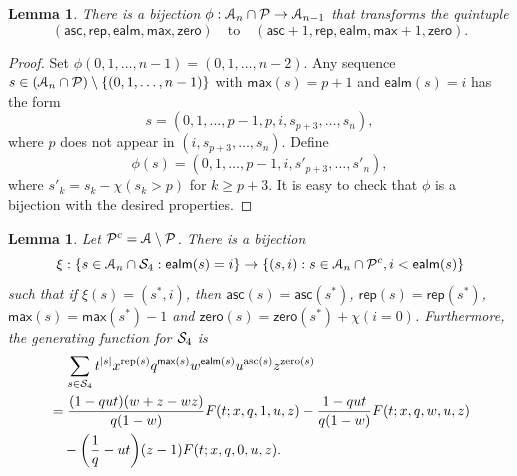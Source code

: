 \documentclass[12pt]{amsart}
\newcounter{mycount}
\theoremstyle{plain}
\newtheorem{lemma}[mycount]{Lemma}
\theoremstyle{definition}
\theoremstyle{example}
\theoremstyle{remark}
\numberwithin{equation}{section}
\numberwithin{figure}{section}
\newcommand{\asc}{\mathsf{asc}}
\def\max{\mathsf{max}}
\def\zero{\mathsf{zero}}
\def\rep{\mathsf{rep}}
\def\ealm{\mathsf{ealm}}
\def\A{\mathcal{A}}
\def\CS{ \CMcal{S}}
\begin{document}
\begin{lemma}\label{L:case3}
There is a bijection $\phi:\A_n\cap\CMcal{P} \rightarrow \A_{n-1}$ that transforms the quintuple
$$
(\asc,\rep,\ealm,\max,\zero)\quad\text{to}\quad(\asc+1,\rep,\ealm,\max+1,\zero).
$$
\end{lemma}
\begin{proof}
Set $\phi(0,1,\ldots,n-1)=(0,1,\ldots,n-2)$. Any sequence $s\in(\A_n\cap\CMcal{P})\setminus\{(0,1,\ldots,n-1)\}$ with $\max(s)=p+1$ and $\ealm(s)=i$ has the form
$$
s=(0,1,\ldots,p-1,p,i,s_{p+3},\ldots,s_n),
$$
 where $p$ does not appear in  $(i,s_{p+3},\ldots,s_n)$. Define
 $$
 \phi(s)=(0,1,\ldots,p-1,i,s'_{p+3},\ldots,s'_n),
 $$
 where $s'_k=s_k-\chi(s_k>p)$ for $k\geq p+3$. It is easy to check that $\phi$ is a bijection with the desired properties. 
\end{proof}


\begin{lemma}\label{L:c3}
Let  $\CMcal{P}^c=\A\setminus\CMcal{P}$. There is a bijection
$$
\xi: \{s\in\A_n\cap\CS_4:\ealm(s)=i\} \rightarrow \{(s,i): s\in\A_n\cap\CMcal{P}^c,i<\ealm(s)\}
$$
such that if $\xi(s)=(s^*,i)$,
then $\asc(s)=\asc(s^*)$, $\rep(s)=\rep(s^*)$, $\max(s)=\max(s^*)-1$ and $\zero(s)=\zero(s^*)+\chi(i=0)$.
Furthermore, the generating function for $\CS_4$ is
\begin{align}
&\,\quad \sum_{s\in\CMcal{S}_4}t^{\vert s\vert}x^{\mathrm{rep}(s)}q^{\max(s)}w^{\ealm(s)}u^{\mathrm{asc}(s)}z^{\mathrm{zero}(s)}\label{eq:case4}\\
\nonumber&=\frac{(1-qut)(w+z-wz)}{q(1-w)}F(t;x,q,1,u,z)-\frac{1-qut}{q(1-w)}F(t;x,q,w,u,z)\\
\nonumber&\quad -\biggl(\frac{1}{q}-ut\biggr)(z-1)F(t;x,q,0,u,z).
\end{align}
\end{lemma}
\end{document}
